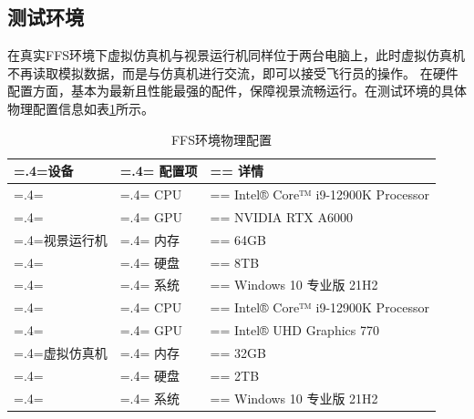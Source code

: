 \subsection{测试环境}
在真实FFS环境下虚拟仿真机与视景运行机同样位于两台电脑上，此时虚拟仿真机不再读取模拟数据，而是与仿真机进行交流，即可以接受飞行员的操作。
在硬件配置方面，基本为最新且性能最强的配件，保障视景流畅运行。在测试环境的具体物理配置信息如表\ref{ffshard}所示。
\clearpage
\begin{table}[h!]
    \begin{center}
        \caption{FFS环境物理配置}
        \label{ffshard}
        \renewcommand\arraystretch{1.5}
        \begin{tabularx}{\textwidth}{ 
             >{\centering\arraybackslash\hsize=.4\hsize\linewidth=\hsize}X 
             >{\centering\arraybackslash\hsize=.4\hsize\linewidth=\hsize}X 
             >{\centering\arraybackslash\hsize=\hsize\linewidth=\hsize}X 
             }
             \hline
            \textbf{设备} & \textbf{配置项} & \textbf{详情}\\         
             \hline
             & CPU & Intel® Core™ i9-12900K Processor\\
           
             & GPU & NVIDIA RTX A6000\\
             
             视景运行机 & 内存 & 64GB\\
            
             & 硬盘 & 8TB\\
             
             & 系统 & Windows 10 专业版 21H2\\
             \hline
             & CPU & Intel® Core™ i9-12900K Processor\\
           
             & GPU & Intel® UHD Graphics 770\\
             
             虚拟仿真机 & 内存 & 32GB\\
            
             & 硬盘 & 2TB\\
             
             & 系统 & Windows 10 专业版 21H2\\
             \hline
             
            \end{tabularx}
    \end{center}
\end{table}
